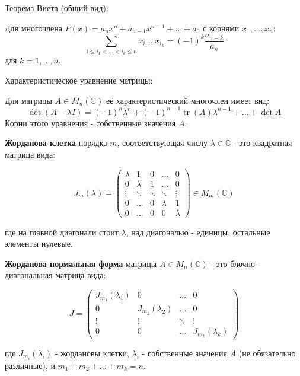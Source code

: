 \documentclass[12pt]{article}
\begin{document}
\begin{theorembox}
    Теорема Виета (общий вид):
    
    Для многочлена $P(x) = a_nx^n + a_{n-1}x^{n-1} + \dots + a_0$ с корнями $x_1, \dots, x_n$:
    $$\sum_{1 \leq i_1 < \dots < i_k \leq n} x_{i_1}\dots x_{i_k} = (-1)^k \frac{a_{n-k}}{a_n}$$
    для $k = 1, \dots, n$.
\end{theorembox}

\begin{theorembox}
    Характеристическое уравнение матрицы:
    
    Для матрицы $A \in M_n(\mathbb{C})$ её характеристический многочлен имеет вид:
    $$\det(A - \lambda I) = (-1)^n\lambda^n + (-1)^{n-1}\operatorname{tr}(A)\lambda^{n-1} + \dots + \det A$$
    Корни этого уравнения - собственные значения $A$.
\end{theorembox}

\begin{definitionbox}
    \textbf{Жорданова клетка} порядка $m$, соответствующая числу $\lambda \in \mathbb{C}$ - это квадратная матрица вида:
    
    \[
    J_m(\lambda) = \begin{pmatrix}
        \lambda & 1       & 0       & \dots  & 0 \\
        0       & \lambda & 1       & \dots  & 0 \\
        \vdots  & \ddots  & \ddots  & \ddots & \vdots \\
        0       & \dots   & 0       & \lambda & 1 \\
        0       & \dots   & 0       & 0      & \lambda
    \end{pmatrix} \in M_m(\mathbb{C})
    \]
    
    где на главной диагонали стоит $\lambda$, над диагональю - единицы, остальные элементы нулевые.
\end{definitionbox}

\begin{definitionbox}
    \textbf{Жорданова нормальная форма} матрицы $A \in M_n(\mathbb{C})$ - это блочно-диагональная матрица вида:
    
    \[
    J = \begin{pmatrix}
        J_{m_1}(\lambda_1) & 0                  & \dots  & 0 \\
        0                  & J_{m_2}(\lambda_2) & \dots  & 0 \\
        \vdots             & \vdots             & \ddots & \vdots \\
        0                  & 0                  & \dots  & J_{m_k}(\lambda_k)
    \end{pmatrix}
    \]
    
    где $J_{m_i}(\lambda_i)$ - жордановы клетки, $\lambda_i$ - собственные значения $A$ (не обязательно различные), и $m_1 + m_2 + \dots + m_k = n$.
\end{definitionbox}
\end{document}

